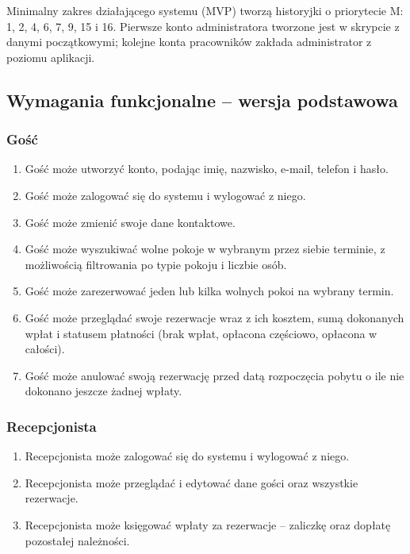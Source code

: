 \documentclass[12pt,a4paper]{article}
\begin{document}
Minimalny zakres działającego systemu (MVP) tworzą historyjki o priorytecie M:
1, 2, 4, 6, 7, 9, 15 i 16. Pierwsze konto administratora tworzone jest
w skrypcie z danymi początkowymi; kolejne konta pracowników zakłada
administrator z poziomu aplikacji.

\subsection{Wymagania funkcjonalne -- wersja podstawowa}
\label{sec:wymagania}

\subsubsection*{Gość}
\begin{enumerate}[label=F\arabic*., ref=F\arabic*, series=wymagania]
    \item Gość może utworzyć konto, podając imię, nazwisko, e-mail, telefon i hasło. \label{f:rejestracja}
    \item Gość może zalogować się do systemu i wylogować z niego. \label{f:logowanie}
    \item Gość może zmienić swoje dane kontaktowe. \label{f:zmianadanych}
    \item Gość może wyszukiwać wolne pokoje w wybranym przez siebie terminie, z możliwością
          filtrowania po typie pokoju i liczbie osób. \label{f:wolne}
    \item Gość może zarezerwować jeden lub kilka wolnych pokoi na wybrany
          termin. \label{f:rezerwacja}
    \item Gość może przeglądać swoje rezerwacje wraz z ich kosztem,
          sumą dokonanych wpłat i statusem płatności (brak wpłat,
          opłacona częściowo, opłacona w całości). \label{f:status}
    \item Gość może anulować swoją rezerwację przed datą rozpoczęcia pobytu o ile nie dokonano jeszcze żadnej wpłaty. \label{f:anulowanie}
\end{enumerate}

\subsubsection*{Recepcjonista}
\begin{enumerate}[label=F\arabic*., ref=F\arabic*, resume=wymagania]
    \item Recepcjonista może zalogować się do systemu i wylogować z niego. \label{f:logowanierecepcja}
    \item Recepcjonista może przeglądać i edytować dane gości oraz
          wszystkie rezerwacje. \label{f:danegosci}
    \item Recepcjonista może księgować wpłaty za rezerwacje -- zaliczkę oraz dopłatę pozostałej należności. \label{f:wplaty}
\end{enumerate}
\end{document}
